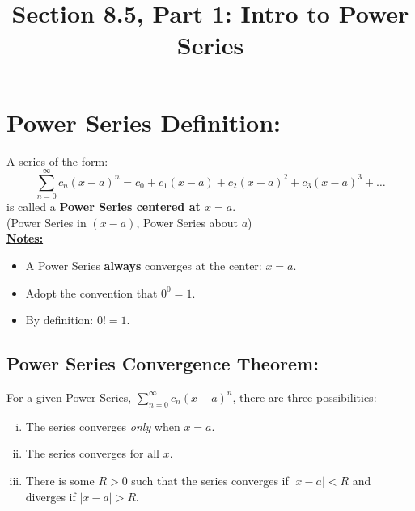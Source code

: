 \documentclass[10pt]{article}
\begin{document}
\newcommand{\an}{\lbrace a_n \rbrace}
\newcommand{\Sum}{\sum_{n=1}^\infty }
\newcommand{\Sumzero}{\sum_{n=0}^\infty }

\everymath{\displaystyle}

\renewcommand{\myTitle}{\	MATH 1336: Calculus III}

\renewcommand{\mySubTitle}{Section 8.5, Part 1: Intro to Power Series}%

\title{\mySubTitle}\date{}
\maketitle



\hspace*{-.8in}%

\setlength{\columnseprule}{.4pt}
\setlength{\columnsep}{3em}
\section*{Power Series Definition:}
A series of the form:
\[
\Sumzero c_n (x-a)^n = c_0 + c_1 (x-a) + c_2 (x-a)^2 + c_3 (x-a)^3 +\ldots
\]
is called a \textbf{Power Series centered at \(x=a\)}.\\
 (Power Series in \((x-a)\), Power Series about \(a\))\\
 
\underline{\textbf{Notes:}}
\begin{itemize}
\item A Power Series \textbf{always} converges at the center: \(x=a\).
\item Adopt the convention that \(0^0 = 1\).
\item By definition: \(0! = 1\).
\end{itemize}
 
 
\subsection*{Power Series Convergence Theorem:}
For a given Power Series, \(\Sumzero c_n (x-a)^n\), there are three possibilities:
 \begin{enumerate}[(i)] 
 \item The series converges \textit{only} when \(x=a\). 
 \item The series converges for all \(x\).
 \item There is some \(R>0\) such that the series converges if \(|x-a|<R\) and diverges if \(|x-a|>R\).
 \end{enumerate}
 
\end{document}
